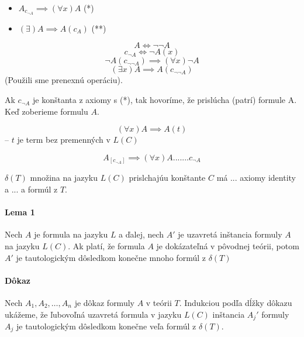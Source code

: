 \begin{itemize}
	\item $A_{c_{\neg A}} \implies (\forall x) A$ (*)
	\item $(\exists ) A \implies A(c_A)$ (**)
\end{itemize}

$$A \iff \neg \neg A$$
$$c_{\neg A} \iff \neg A(x)$$
$$\neg A(c_{\neg\neg A}) \implies (\forall x)\neg A$$
$$(\exists x) A \implies A(c_{\neg\neg A})$$
(Použili sme prenexnú operáciu).

\par Ak $c_{\neg A}$ je konštanta z axiomy s (*), tak hovoríme, že prislúcha
(patrí) formule A. Keď zoberieme formulu $A$.

$$(\forall x) A \implies A(t)$$ -- $t$ je term bez premenných v $L(C)$

$$A_{[c_{\neg A}]} \implies (\forall x) A \mbox{.......} c_{\neg A}$$

$\delta(T)$ množina na jazyku $L(C)$ prislchajúu konštante $C$ má ... axiomy
identity a ... a formúl z $T$.


\paragraph{Lema 1} Nech $A$ je formula na jazyku $L$ a ďalej, nech $A'$ je
uzavretá inštancia formuly $A$ na jazyku $L(C)$. Ak platí, že formula $A$ je
dokázateľná v pôvodnej teórii, potom $A'$ je tautologickým dôsledkom konečne
mnoho formúl z $\delta(T)$

\paragraph{Dôkaz} Nech $A_1, A_2, \ldots, A_n$ je dôkaz formuly $A$ v teórii
$T$. Indukciou podľa dĺžky dôkazu ukážeme, že ľubovoľná uzavretá formula v
jazyku $L(C)$ inštancia $A_j'$ formuly $A_j$ je tautologickým dôsledkom konečne
veľa formúl z $\delta(T)$.

